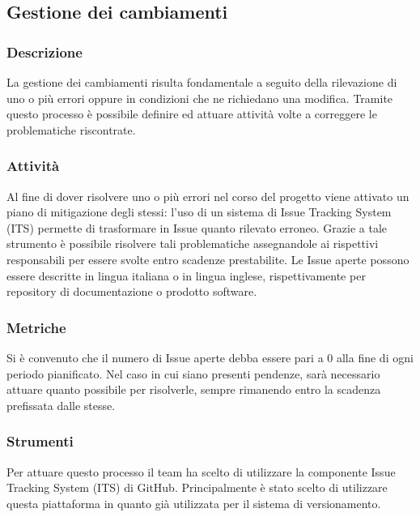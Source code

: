 \subsection{Gestione dei cambiamenti}
	
	\subsubsection{Descrizione}
		La gestione dei cambiamenti risulta fondamentale a seguito della rilevazione di uno o più errori oppure in condizioni che ne richiedano una modifica. Tramite questo processo è possibile definire ed attuare attività volte a correggere le problematiche riscontrate.
	
	
	\subsubsection{Attività}
			Al fine di dover risolvere uno o più errori nel corso del progetto viene attivato un piano di mitigazione degli stessi: l'uso di un sistema di Issue Tracking System (ITS) permette di trasformare in Issue quanto rilevato erroneo. Grazie a tale strumento è possibile risolvere tali problematiche assegnandole ai rispettivi responsabili per essere svolte entro scadenze prestabilite. Le Issue aperte possono essere descritte in lingua italiana o in lingua inglese, rispettivamente per repository di documentazione o prodotto software.
	
	
	\subsubsection{Metriche}
			Si è convenuto che il numero di Issue aperte debba essere pari a 0 alla fine di ogni periodo pianificato. Nel caso in cui siano presenti pendenze, sarà necessario attuare quanto possibile per risolverle, sempre rimanendo entro la scadenza prefissata dalle stesse.
			
			
	\subsubsection{Strumenti}
			Per attuare questo processo il team ha scelto di utilizzare la componente Issue Tracking System (ITS) di GitHub. Principalmente è stato scelto di utilizzare questa piattaforma in quanto già utilizzata per il sistema di versionamento.